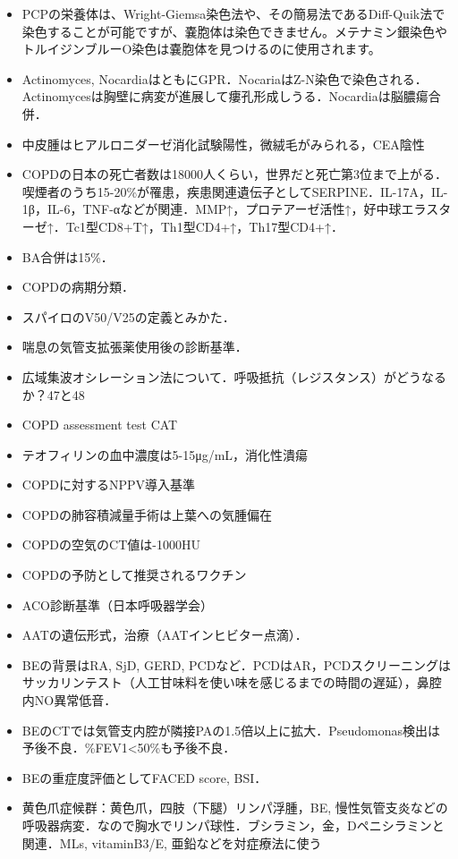 \begin{itemize}
\item PCPの栄養体は、Wright-Giemsa染色法や、その簡易法であるDiff-Quik法で染色することが可能ですが、嚢胞体は染色できません。メテナミン銀染色やトルイジンブルーO染色は嚢胞体を見つけるのに使用されます。

\item Actinomyces, NocardiaはともにGPR．NocariaはZ-N染色で染色される．Actinomycesは胸壁に病変が進展して瘻孔形成しうる．Nocardiaは脳膿瘍合併．


\item 中皮腫はヒアルロニダーゼ消化試験陽性，微絨毛がみられる，CEA陰性

\item COPDの日本の死亡者数は18000人くらい，世界だと死亡第3位まで上がる．喫煙者のうち15-20\%が罹患，疾患関連遺伝子としてSERPINE．IL-17A，IL-1β，IL-6，TNF-αなどが関連．MMP↑，プロテアーゼ活性↑，好中球エラスターゼ↑．Tc1型CD8+T↑，Th1型CD4+↑，Th17型CD4+↑．
\item BA合併は15\%．
\item COPDの病期分類．
\item スパイロのV50/V25の定義とみかた．
\item 喘息の気管支拡張薬使用後の診断基準．
\item 広域集波オシレーション法について．呼吸抵抗（レジスタンス）がどうなるか？47と48
\item COPD assessment test CAT
\item テオフィリンの血中濃度は5-15μg/mL，消化性潰瘍
\item COPDに対するNPPV導入基準
\item COPDの肺容積減量手術は上葉への気腫偏在
\item COPDの空気のCT値は-1000HU
\item COPDの予防として推奨されるワクチン
\item ACO診断基準（日本呼吸器学会）
\item AATの遺伝形式，治療（AATインヒビター点滴）．
\item BEの背景はRA, SjD, GERD, PCDなど．PCDはAR，PCDスクリーニングはサッカリンテスト（人工甘味料を使い味を感じるまでの時間の遅延），鼻腔内NO異常低音．
\item BEのCTでは気管支内腔が隣接PAの1.5倍以上に拡大．Pseudomonas検出は予後不良．\%FEV1<50\%も予後不良．
\item BEの重症度評価としてFACED score, BSI．
\item 黄色爪症候群：黄色爪，四肢（下腿）リンパ浮腫，BE, 慢性気管支炎などの呼吸器病変．なので胸水でリンパ球性．ブシラミン，金，Dペニシラミンと関連．MLs, vitaminB3/E, 亜鉛などを対症療法に使う

\end{itemize}
